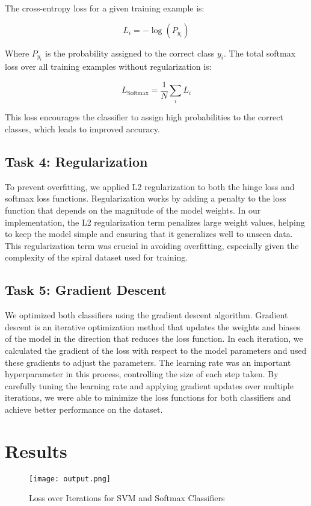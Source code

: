 \documentclass{article}
\begin{document}
The cross-entropy loss for a given training example is:

\begin{equation}
    L_i = -\log(P_{y_i})
\end{equation}

Where \( P_{y_i} \) is the probability assigned to the correct class \( y_i \). The total softmax loss over all training examples without regularization is:

\begin{equation}
    L_{\text{Softmax}} = \frac{1}{N} \sum_{i} L_i
\end{equation}

This loss encourages the classifier to assign high probabilities to the correct classes, which leads to improved accuracy.

\subsection{Task 4: Regularization}

To prevent overfitting, we applied L2 regularization to both the hinge loss and softmax loss functions. Regularization works by adding a penalty to the loss function that depends on the magnitude of the model weights. In our implementation, the L2 regularization term penalizes large weight values, helping to keep the model simple and ensuring that it generalizes well to unseen data. This regularization term was crucial in avoiding overfitting, especially given the complexity of the spiral dataset used for training.

\subsection{Task 5: Gradient Descent}
We optimized both classifiers using the gradient descent algorithm. Gradient descent is an iterative optimization method that updates the weights and biases of the model in the direction that reduces the loss function. In each iteration, we calculated the gradient of the loss with respect to the model parameters and used these gradients to adjust the parameters. The learning rate was an important hyperparameter in this process, controlling the size of each step taken. By carefully tuning the learning rate and applying gradient updates over multiple iterations, we were able to minimize the loss functions for both classifiers and achieve better performance on the dataset.


\section{Results}
\begin{figure}[H]
    \centering
    \texttt{[image: output.png]}
    \caption{Loss over Iterations for SVM and Softmax Classifiers}
    \label{fig:loss}
\end{figure}
\end{document}
